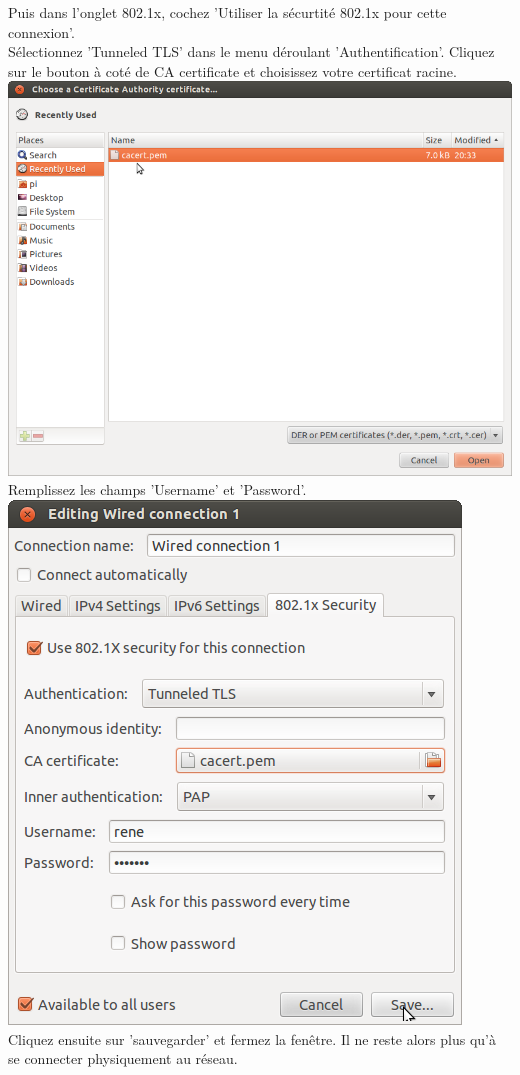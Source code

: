 Puis dans l'onglet 802.1x, cochez 'Utiliser la sécurtité 802.1x pour cette connexion'.\\
Sélectionnez 'Tunneled TLS' dans le menu déroulant 'Authentification'. 
Cliquez sur le bouton à coté de CA certificate et choisissez votre certificat racine.\\
\includegraphics[width=\screenShotSize{}]{imgUser/selectCacert.png}\\
Remplissez les champs 'Username' et 'Password'.\\
\includegraphics[width=\screenShotSize{}]{imgUser/ttls.png}\\
Cliquez ensuite sur 'sauvegarder' et fermez la fenêtre.
Il ne reste alors plus qu'à se connecter physiquement au réseau.\\

